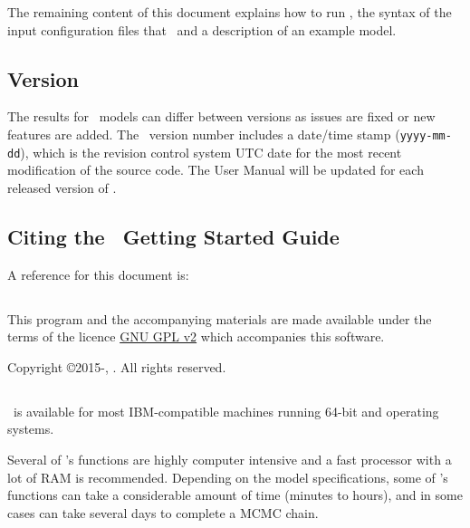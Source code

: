 The remaining content of this document explains how to run \CNAME, the syntax of the input configuration files that \CNAME\, and a description of an example model.

\subsection{Version\label{sec:version}}

The results for \CNAME\ models can differ between versions as issues are fixed or new features are added. The \CNAME\ version number includes a date/time stamp (\texttt{yyyy-mm-dd}), which is the revision control system UTC date for the most recent modification of the source code. The User Manual will be updated for each released version of \CNAME.

\subsection{Citing the \CNAME\ Getting Started Guide}

A reference for this document is: 

\ManualRef{}
 
\subsection{}

This program and the accompanying materials are made available under the terms of the licence \href{http://www.gnu.org/licenses/old-licenses/gpl-2.0.en.html}{GNU GPL v2} which accompanies this software.

Copyright \copyright 2015-\SourceControlYearDoc, \href{http://www.niwa.co.nz}{\Organisation}. All rights reserved.

\subsection{}

\CNAME\ is available for most IBM-compatible machines running 64-bit  and  operating systems.

Several of \CNAME's functions are highly computer intensive and a fast processor with a lot of RAM is recommended. Depending on the model specifications, some of \CNAME's functions can take a considerable amount of time (minutes to hours), and in some cases can take several days to complete a MCMC chain.

